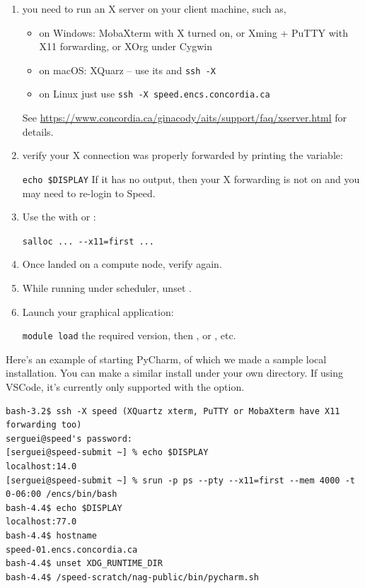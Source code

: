 \begin{enumerate}
\item
you need to run an X server on your client machine, such as,
\begin{itemize}
\item on Windows: MobaXterm with X turned on, or Xming + PuTTY with X11 forwarding, or XOrg under Cygwin
\item on macOS: XQuarz -- use its  and \texttt{ssh -X}
\item on Linux just use \texttt{ssh -X speed.encs.concordia.ca} 
\end{itemize}

See \url{https://www.concordia.ca/ginacody/aits/support/faq/xserver.html}
for details.

\item
verify your X connection was properly forwarded by printing the  variable:

\verb+echo $DISPLAY+
If it has no output, then your X forwarding is not on and you may need to re-login to Speed.

\item
Use the  with  or :

\verb+salloc ... --x11=first ...+

\item
Once landed on a compute node, verify  again.

\item
While running under scheduler, unset .

\item
Launch your graphical application:

\texttt{module load} the required version, then
, or , etc.
\end{enumerate}

Here's an example of starting PyCharm, of which we made a sample local installation.
You can make a similar install under your own directory. If using VSCode, it's
currently only supported with the  option.

\scriptsize
\begin{verbatim}
bash-3.2$ ssh -X speed (XQuartz xterm, PuTTY or MobaXterm have X11 forwarding too)
serguei@speed's password: 
[serguei@speed-submit ~] % echo $DISPLAY
localhost:14.0
[serguei@speed-submit ~] % srun -p ps --pty --x11=first --mem 4000 -t 0-06:00 /encs/bin/bash
bash-4.4$ echo $DISPLAY
localhost:77.0
bash-4.4$ hostname
speed-01.encs.concordia.ca
bash-4.4$ unset XDG_RUNTIME_DIR
bash-4.4$ /speed-scratch/nag-public/bin/pycharm.sh
\end{verbatim}
\normalsize

